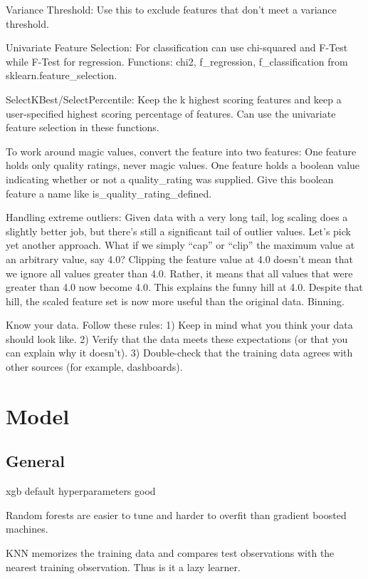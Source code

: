 \documentclass[]{book}
\begin{document}
Variance Threshold: Use this to exclude features that don't meet a variance threshold.

Univariate Feature Selection: For classification can use chi-squared and F-Test while F-Test for regression. Functions: chi2, f\_regression, f\_classification from sklearn.feature\_selection.

SelectKBest/SelectPercentile: Keep the k highest scoring features and keep a user-specified highest scoring percentage of features. Can use the univariate feature selection in these functions.

To work around magic values, convert the feature into two features: One feature holds only quality ratings, never magic values. One feature holds a boolean value indicating whether or not a quality\_rating was supplied. Give this boolean feature a name like is\_quality\_rating\_defined.

Handling extreme outliers: Given data with a very long tail, log scaling does a slightly better job, but there's still a significant tail of outlier values. Let's pick yet another approach. What if we simply ``cap'' or ``clip'' the maximum value at an arbitrary value, say 4.0? Clipping the feature value at 4.0 doesn't mean that we ignore all values greater than 4.0. Rather, it means that all values that were greater than 4.0 now become 4.0. This explains the funny hill at 4.0. Despite that hill, the scaled feature set is now more useful than the original data. Binning.

Know your data. Follow these rules: 1) Keep in mind what you think your data should look like. 2) Verify that the data meets these expectations (or that you can explain why it doesn't). 3) Double-check that the training data agrees with other sources (for example, dashboards).

\hypertarget{model-1}{%
\chapter{Model}\label{model-1}}

\hypertarget{general-2}{%
\section{General}\label{general-2}}

xgb default hyperparameters good

Random forests are easier to tune and harder to overfit than gradient boosted machines.

KNN memorizes the training data and compares test observations with the nearest training observation. Thus is it a lazy learner.
\end{document}
